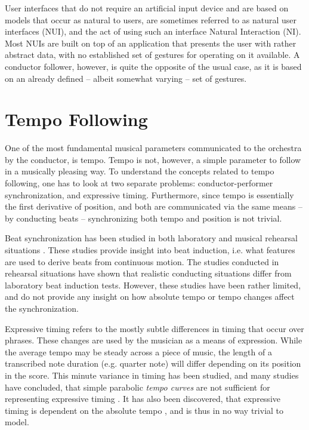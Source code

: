 User interfaces that do not require an artificial input device
and are based on models that occur as natural to users,
are sometimes referred to as natural user interfaces (NUI),
and the act of using such an interface Natural Interaction (NI).
Most NUIs are built on top of an application
that presents the user with rather abstract data,
with no established set of gestures for operating on it available.
A conductor follower, however,
is quite the opposite of the usual case,
as it is based on an already defined --
albeit somewhat varying -- set of gestures.

\section{Tempo Following}

One of the most fundamental musical parameters communicated
to the orchestra by the conductor, is tempo.
Tempo is not, however, a simple parameter to follow
in a musically pleasing way.
To understand the concepts related to tempo following,
one has to look at two separate problems:
conductor-performer synchronization,
and expressive timing.
Furthermore, since tempo is essentially the
first derivative of position,
and both are communicated via the same means --
by conducting beats --
synchronizing both tempo and position is not trivial.

Beat synchronization has been studied in
both laboratory \cite{LuckSloboda2008, LuckSloboda2009}
and musical rehearsal situations \cite{luck2006}.
These studies provide insight into
beat induction, i.e.
what features are used to
derive beats from continuous motion.
The studies conducted in rehearsal situations
have shown that realistic conducting
situations differ from laboratory beat induction tests.
However, these studies have been rather limited,
and do not provide any insight on
how absolute tempo or tempo changes
affect the synchronization.

Expressive timing refers to the mostly subtle
differences in timing that occur over phrases.
These changes are used by the musician as a means of expression.
While the average tempo may be steady across a piece of music,
the length of a transcribed note duration (e.g. quarter note)
will differ depending on its position in the score.
This minute variance in timing has been studied,
and many studies have concluded,
that simple parabolic \textit{tempo curves} are not sufficient
for representing expressive timing
\cite{Desain1993, Kirke2012}.
It has also been discovered,
that expressive timing is
dependent on the absolute tempo \cite{Desain1993, Desain1994},
and is thus in no way trivial to model.

